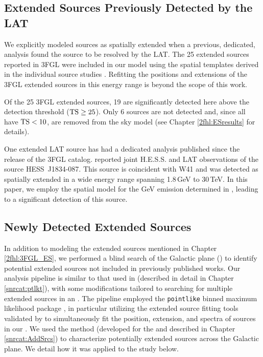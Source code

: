 %
%

\subsection{\label{2fhl:3FGL_ES}Extended Sources Previously Detected by the LAT}
We explicitly modeled sources as spatially extended when a previous, dedicated, analysis found the source to be resolved by the LAT.
The 25 extended sources reported in 3FGL were included in our model using the spatial templates derived in the individual source studies \citep[see references in ][]{3FGL}. Refitting the positions and extensions of the 3FGL extended sources in this energy range is beyond the scope of this work.

Of the 25 3FGL extended sources, 19 are significantly detected here above the detection threshold (${\rm TS}\geq25$). Only 6 sources are not detected and, since all have  ${\rm TS<10}$, are removed from the sky model (see Chapter \ref{2fhl:ESresults} for details).

One extended LAT source has had a dedicated analysis published since the release of the 3FGL catalog. \cite{HESSLATW41} reported joint H.E.S.S. and LAT observations of the \vhe{} source HESS~J1834-087. This source is coincident with \snr{} W41 and was detected  as spatially extended in a wide energy range spanning 1.8\,GeV to 30\,TeV. In this paper, we employ the spatial model for the GeV emission determined in \cite{HESSLATW41}, leading to a significant detection of this source.


%
%
\subsection{\label{2fhl:newES}Newly Detected Extended Sources} %

In addition to modeling the extended sources mentioned in Chapter \ref{2fhl:3FGL_ES}, we performed a blind search of the Galactic plane  (\blat) to identify potential extended sources not included in previously published works. Our analysis pipeline is similar to that used in \cite{snrCat} (described in detail in Chapter \ref{snrcat:ptlkt}), with some modifications tailored to searching for multiple extended sources in an \roi{}. The pipeline employed the {\tt pointlike} binned maximum likelihood package \citep{Kerr10}, in particular utilizing the extended source fitting tools validated by \cite{Lande12} to simultaneously fit the position, extension, and spectra of sources in our \rois{}. We used the \srcs{} method (developed for the \snrcat{} and described in Chapter \ref{snrcat:AddSrcs}) to characterize potentially extended sources across the Galactic plane. We detail how it was applied to the \twofhl{} study below.

